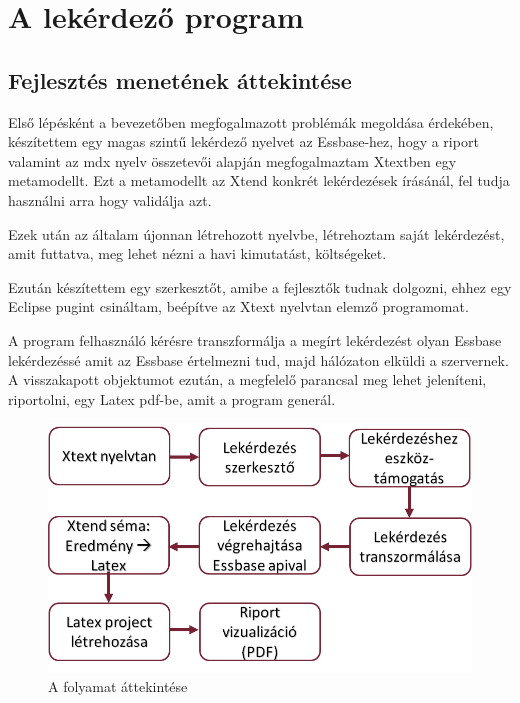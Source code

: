 \chapter{A lekérdező program}\label{sect:Ellaboration}
\section{Fejlesztés menetének áttekintése}
Első lépésként a bevezetőben megfogalmazott problémák megoldása érdekében, készítettem egy magas szintű lekérdező nyelvet az Essbase-hez, hogy a riport valamint az mdx nyelv összetevői alapján megfogalmaztam Xtextben egy metamodellt. Ezt a metamodellt az Xtend konkrét lekérdezések írásánál, fel tudja használni arra hogy validálja azt.

Ezek után az általam újonnan létrehozott nyelvbe, létrehoztam saját lekérdezést, amit futtatva, meg lehet nézni a havi kimutatást, költségeket.

Ezután készítettem egy szerkesztőt, amibe a fejlesztők tudnak dolgozni, ehhez egy Eclipse pugint csináltam, beépítve az Xtext nyelvtan elemző programomat. 

A program felhasználó kérésre transzformálja a megírt lekérdezést olyan Essbase lekérdezéssé amit az Essbase értelmezni tud, majd hálózaton elküldi a szervernek. A visszakapott objektumot ezután, a megfelelő parancsal meg lehet jeleníteni, riportolni, egy Latex pdf-be, amit a program generál.

 \begin{figure}[!ht]
\centering
\includegraphics[width=120mm, keepaspectratio]{figures/overview.png}
\caption{A folyamat áttekintése} 
\label{fig:Overview}
\end{figure}

